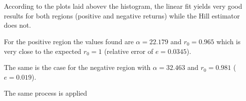 \documentclass[11pt]{article}
\begin{document}
    \begin{center}
    \end{center}
    { \hspace*{\fill} \\}
    
    \begin{center}
    \end{center}
    { \hspace*{\fill} \\}
    
    According to the plots laid abovev the histogram, the linear fit yields
very good results for both regions (positive and negative returns) while
the Hill estimator does not.

For the positive region the values found are \(\alpha = 22.179\) and
\(r_0 = 0.965\) which is very close to the expected \(r_0 = 1\)
(relative error of \(e=0.0345\)).

The same is the case for the negative region with \(\alpha = 32.463\)
and \(r_0 = 0.981\) (\(e=0.019\)).

    The same process is applied
\end{document}
